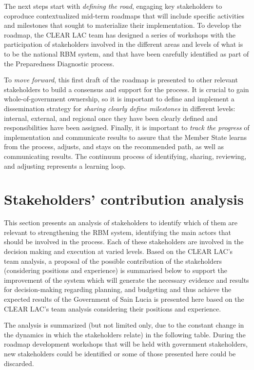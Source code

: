 \documentclass[
  10pt,
]{book}
\begin{document}
The next steps start with \emph{defining the road}, engaging key stakeholders to coproduce contextualized mid-term roadmaps that will include specific activities and milestones that sought to materialize their implementation. To develop the roadmap, the CLEAR LAC team has designed a series of workshops with the participation of stakeholders involved in the different areas and levels of what is to be the national RBM system, and that have been carefully identified as part of the Preparedness Diagnostic process.

To \emph{move forward}, this first draft of the roadmap is presented to other relevant stakeholders to build a consensus and support for the process. It is crucial to gain whole-of-government ownership, so it is important to define and implement a dissemination strategy for \emph{sharing clearly define milestones} in different levels: internal, external, and regional once they have been clearly defined and responsibilities have been assigned. Finally, it is important to \emph{track the progress} of implementation and communicate results to assure that the Member State learns from the process, adjusts, and stays on the recommended path, as well as communicating results. The continuum process of identifying, sharing, reviewing, and adjusting represents a learning loop.

\hypertarget{stakeholders-contribution-analysis}{%
\section{Stakeholders' contribution analysis}\label{stakeholders-contribution-analysis}}

This section presents an analysis of stakeholders to identify which of them are relevant to strengthening the RBM system, identifying the main actors that should be involved in the process. Each of these stakeholders are involved in the decision making and execution at varied levels. Based on the CLEAR LAC's team analysis, a proposal of the possible contribution of the stakeholders (considering positions and experience) is summarised below to support the improvement of the system which will generate the necessary evidence and results for decision-making regarding planning, and budgeting and thus achieve the expected results of the Government of Sain Lucia is presented here based on the CLEAR LAC's team analysis considering their positions and experience.

The analysis is summarized (but not limited only, due to the constant change in the dynamics in which the stakeholders relate) in the following table. During the roadmap development workshops that will be held with government stakeholders, new stakeholders could be identified or some of those presented here could be discarded.
\end{document}
